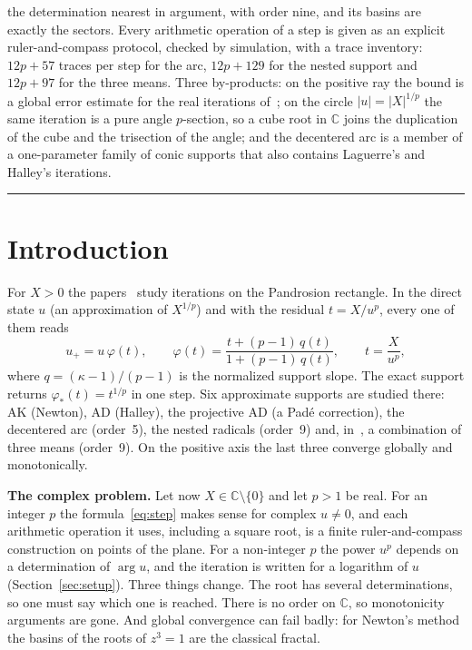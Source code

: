 \documentclass[10pt,a4paper]{article}
\theoremstyle{plain}
\theoremstyle{remark}
\numberwithin{equation}{section}
\newcommand{\C}{\mathbb{C}}\newcommand{\R}{\mathbb{R}}\newcommand{\Hp}{\mathbb{H}}
\begin{document}
the determination nearest in argument, with order nine, and its basins are exactly the sectors.
Every arithmetic operation of a step is given
as an explicit ruler-and-compass protocol, checked by simulation, with a trace inventory: $12p+57$
traces per step for the arc, $12p+129$ for the nested support and $12p+97$ for the three means. Three by-products: on the positive ray the bound is a global
error estimate for the real iterations of~\cite{v28,v29}; on the circle $|u|=|X|^{1/p}$ the same
iteration is a pure angle $p$-section, so a cube root in $\C$ joins the duplication of the cube and
the trisection of the angle; and the decentered arc is a member of a one-parameter family of conic
supports that also contains Laguerre's and Halley's iterations.

\vspace{4pt}\hrule

\section{Introduction}

For $X>0$ the papers~\cite{v28,v29} study iterations on the Pandrosion rectangle. In the direct state
$u$ (an approximation of $X^{1/p}$) and with the residual $t=X/u^{p}$, every one of them reads
\begin{equation}\label{eq:step}
  u_{+}=u\,\varphi(t),\qquad \varphi(t)=\frac{t+(p-1)\,q(t)}{1+(p-1)\,q(t)},\qquad t=\frac{X}{u^{p}},
\end{equation}
where $q=(\kappa-1)/(p-1)$ is the normalized support slope. The exact support returns
$\varphi_*(t)=t^{1/p}$ in one step. Six approximate supports are studied there: AK (Newton), AD
(Halley), the projective AD (a Pad\'e correction), the decentered arc (order~5), the nested
radicals (order~9) and, in~\cite{v29}, a combination of three means (order~9). On the positive axis
the last three converge globally and monotonically.

\textbf{The complex problem.} Let now $X\in\C\setminus\{0\}$ and let $p>1$ be real. For an integer
$p$ the formula~\eqref{eq:step} makes sense for complex $u\neq0$, and each arithmetic operation it
uses, including a square root, is a finite ruler-and-compass construction on points of the plane.
For a non-integer $p$ the power $u^{p}$ depends on a determination of $\arg u$, and the iteration
is written for a logarithm of $u$ (Section~\ref{sec:setup}). Three things change. The root has
several determinations, so one must say which one is reached. There is no order on $\C$, so monotonicity arguments are gone. And global convergence can
fail badly: for Newton's method the basins of the roots of $z^{3}=1$ are the classical fractal.
\end{document}
